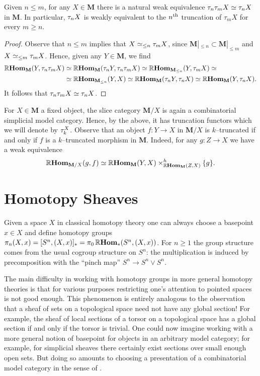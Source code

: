 \begin{corollary}
  Given \(n \leq m\), for any \(X\in\mathbf M\) there is a natural weak equivalence \(\tau_{n}\tau_{m} X \simeq \tau_{n} X\) in \(\mathbf M\). In particular, \(\tau_{n}X\) is weakly equivalent to the \(n\textsuperscript{th}\) truncation of \(\tau_{m}X\) for every \(m\geq n\).
\end{corollary}
\begin{proof}
  Observe that \(n\leq m\) implies that \(X \simeq_{\leq n}\tau_{m}X\), since \(\mathbf M|_{\leq n}\subset \mathbf M|_{\leq m}\) and \(X\simeq_{\leq m}\tau_{m}X\). Hence, given any \(Y\in\mathbf M\), we find
  \begin{align*}
    \operatorname{\mathbb{R}\textnormal{\bfseries Hom}}_{\mathbf M}(Y, \tau_{n}\tau_{m} X)&\simeq \operatorname{\mathbb{R}\textnormal{\bfseries Hom}}_{\mathbf M}(\tau_{n}Y, \tau_{n}\tau_{m}X)\simeq \operatorname{\mathbb{R}\textnormal{\bfseries Hom}}_{\mathbf M_{\leq n}}(Y, \tau_{m}X)\simeq \\
    &\simeq \operatorname{\mathbb{R}\textnormal{\bfseries Hom}}_{\mathbf M_{\leq n}}(Y, X) \simeq \operatorname{\mathbb{R}\textnormal{\bfseries Hom}}_{\mathbf M}(\tau_{n}Y, \tau_{n}X)\simeq \operatorname{\mathbb{R}\textnormal{\bfseries Hom}}_{\mathbf M}(Y, \tau_{n}X).
  \end{align*}
  It follows that \(\tau_{n}\tau_{m}X\simeq \tau_{n}X\).
\end{proof}

For \(X\in\mathbf{M}\) a fixed object, the slice category \(\mathbf M/X\) is again a combinatorial simplicial model category. Hence, by the above, it has truncation functors which we will denote by \(\tau_{k}^{X}\). Observe that an object \(f\colon Y\to X\) in \(\mathbf M/X\) is \(k\)--truncated if and only if \(f\) is a \(k\)--truncated morphism in \(\mathbf M\). Indeed, for any \(g\colon Z\to X\) we have a weak equivalence
\[\operatorname{\mathbb{R}\textnormal{\bfseries Hom}}_{\mathbf M/X}(g, f)\simeq \operatorname{\mathbb{R}\textnormal{\bfseries Hom}}_{\mathbf M}(Y, X)\times^{h}_{\operatorname{\mathbb{R}\textnormal{\bfseries Hom}}_{\mathbf M}(Z, X)} \{g\}.\]

\section{Homotopy Sheaves}

Given a space \(X\) in classical homotopy theory one can always choose a basepoint \(x\in X\) and define homotopy groups \(\pi_{n}(X,x) = [S^{n}, (X,x)]_{*} = \pi_{0}\operatorname{\mathbb{R}\textnormal{\bfseries Hom}}_{*}(S^{n}, (X,x))\). For \(n\geq 1\) the group structure comes from the usual cogroup structure on \(S^{n}\): the multiplication is induced by precomposition with the \enquote{pinch map} \(S^{n}\to S^{n}\vee S^{n}\).

The main difficulty in working with homotopy groups in more general homotopy theories is that for various purposes restricting one's attention to pointed spaces is not good enough. This phenomenon is entirely analogous to the observation that a sheaf of sets on a topological space need not have any global section! For example, the sheaf of local sections of a torsor on a topological space has a global section if and only if the torsor is trivial. One could now imagine working with a more general notion of basepoint for objects in an arbitrary model category; for example, for simplicial sheaves there certainly exist sections over small enough open sets. But doing so amounts to choosing a presentation of a combinatorial model category in the sense of \cite{mr1870516}.

